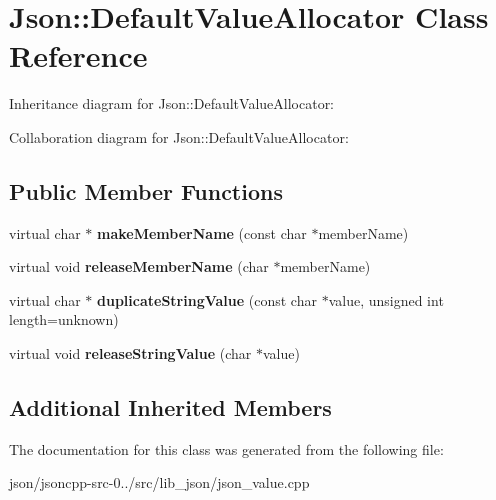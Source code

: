 \hypertarget{class_json_1_1_default_value_allocator}{\section{Json\+:\+:Default\+Value\+Allocator Class Reference}
\label{class_json_1_1_default_value_allocator}
}


Inheritance diagram for Json\+:\+:Default\+Value\+Allocator\+:


Collaboration diagram for Json\+:\+:Default\+Value\+Allocator\+:
\subsection*{Public Member Functions}
\begin{DoxyCompactItemize}
\item 
\hypertarget{class_json_1_1_default_value_allocator_a83643548a23763cd9e8fcc9889ae3428}{virtual char $\ast$ {\bfseries make\+Member\+Name} (const char $\ast$member\+Name)}\label{class_json_1_1_default_value_allocator_a83643548a23763cd9e8fcc9889ae3428}

\item 
\hypertarget{class_json_1_1_default_value_allocator_a62df0985d957573f82be4f520bf00043}{virtual void {\bfseries release\+Member\+Name} (char $\ast$member\+Name)}\label{class_json_1_1_default_value_allocator_a62df0985d957573f82be4f520bf00043}

\item 
\hypertarget{class_json_1_1_default_value_allocator_adc2dc8da259fe1153594787cfcfc68d5}{virtual char $\ast$ {\bfseries duplicate\+String\+Value} (const char $\ast$value, unsigned int length=unknown)}\label{class_json_1_1_default_value_allocator_adc2dc8da259fe1153594787cfcfc68d5}

\item 
\hypertarget{class_json_1_1_default_value_allocator_a5e7f4fbebe7f9263090276e937a6a8d2}{virtual void {\bfseries release\+String\+Value} (char $\ast$value)}\label{class_json_1_1_default_value_allocator_a5e7f4fbebe7f9263090276e937a6a8d2}

\end{DoxyCompactItemize}
\subsection*{Additional Inherited Members}


The documentation for this class was generated from the following file\+:\begin{DoxyCompactItemize}
\item 
json/jsoncpp-\/src-\/0../src/lib\+\_\+json/json\+\_\+value.\+cpp\end{DoxyCompactItemize}

